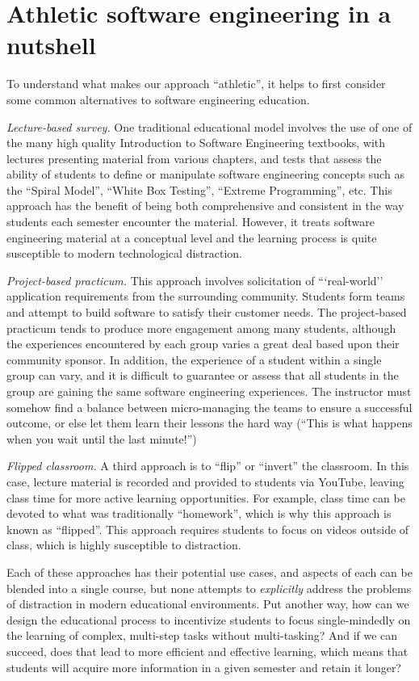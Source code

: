 \section{Athletic software engineering in a nutshell}
\label{section:nutshell}

To understand what makes our approach ``athletic'', it helps to first consider some common alternatives to software engineering education. 

{\em Lecture-based survey.}  One traditional educational model involves the use of one of the many high quality Introduction to Software Engineering textbooks, with lectures presenting material from various chapters, and tests that assess the ability of students to define or manipulate software engineering concepts such as the ``Spiral Model'', ``White Box Testing'', ``Extreme Programming'', etc. This approach has the benefit of being both comprehensive and consistent in the way students each semester encounter the material. However, it treats software engineering material at a conceptual level and the learning process is quite susceptible to modern technological distraction.

{\em Project-based practicum.}  This approach involves solicitation of ```real-world'' application requirements from the surrounding community.  Students form teams and attempt to build software to satisfy their customer needs.  The project-based practicum tends to produce more engagement among many students, although the experiences encountered by each group varies a great deal based upon their community sponsor. In addition, the experience of a student within a single group can vary, and it is difficult to guarantee or assess that all students in the group are gaining the same software engineering experiences. The instructor must somehow find a balance between micro-managing the teams to ensure a successful outcome, or else let them learn their lessons the hard way (``This is what happens when you wait until the last minute!'')

{\em Flipped classroom.}  A third approach is to ``flip'' or ``invert'' the classroom. In this case, lecture material is recorded and provided to students via YouTube, leaving class time for more active learning opportunities. For example, class time can be devoted to what was traditionally ``homework'', which is why this approach is known as ``flipped''.  This approach requires students to focus on videos outside of class, which is highly susceptible to distraction.

Each of these approaches has their potential use cases, and aspects of each can be blended into a single course, but none attempts to {\em explicitly} address the problems of distraction in modern educational environments. Put another way, how can we design the educational process to incentivize students to focus single-mindedly on the learning of complex, multi-step tasks without multi-tasking?  And if we can succeed, does that lead to more efficient and effective learning, which means that students will acquire more information in a given semester and retain it longer? 

